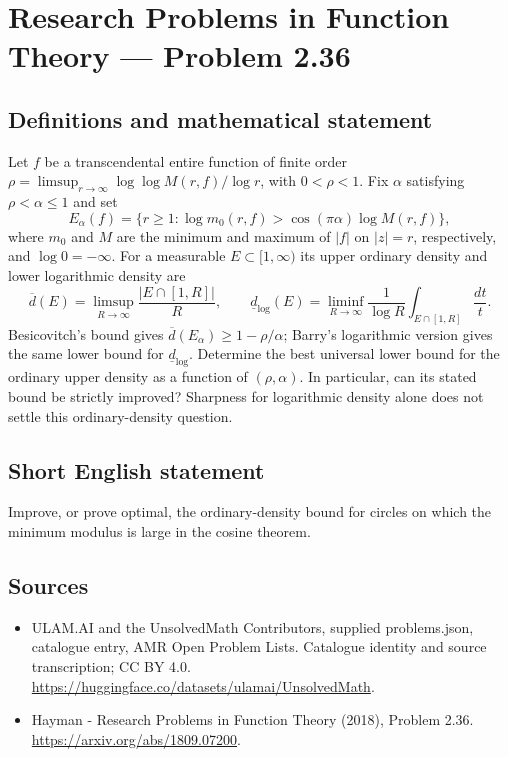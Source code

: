 \documentclass[11pt,a4paper]{article}
\begin{document}
\section*{Research Problems in Function Theory — Problem 2.36}\label{statement}

\subsection{Definitions and mathematical statement}
Let $f$ be a transcendental entire function of finite order
$\rho=\limsup_{r\to\infty}\log\log M(r,f)/\log r$, with $0<\rho<1$.
Fix $\alpha$ satisfying $\rho<\alpha\le1$ and set
\[
E_\alpha(f)=\{r\ge1:\log m_0(r,f)>\cos(\pi\alpha)\log M(r,f)\},
\]
where $m_0$ and $M$ are the minimum and maximum of $|f|$ on $|z|=r$, respectively, and $\log0=-\infty$.
For a measurable $E\subset[1,\infty)$ its upper ordinary density and lower logarithmic density are
\[
\overline d(E)=\limsup_{R\to\infty}\frac{|E\cap[1,R]|}{R},
\qquad
\underline d_{\log}(E)=\liminf_{R\to\infty}\frac1{\log R}\int_{E\cap[1,R]}\frac{dt}{t}.
\]
Besicovitch's bound gives $\overline d(E_\alpha)\ge1-\rho/\alpha$; Barry's logarithmic version gives the same lower bound for $\underline d_{\log}$. Determine the best universal lower bound for the ordinary upper density as a function of $(\rho,\alpha)$. In particular, can its stated bound be strictly improved? Sharpness for logarithmic density alone does not settle this ordinary-density question.
\subsection{Short English statement}
Improve, or prove optimal, the ordinary-density bound for circles on which the minimum modulus is large in the cosine theorem.
\subsection{Sources}
\begin{itemize}
\item[S1] ULAM.AI and the UnsolvedMath Contributors, supplied problems.json, catalogue entry, AMR Open Problem Lists. Catalogue identity and source transcription; CC BY 4.0.
\url{https://huggingface.co/datasets/ulamai/UnsolvedMath}.
\item[S2] Hayman - Research Problems in Function Theory (2018), Problem 2.36. 
\url{https://arxiv.org/abs/1809.07200}.
\end{itemize}
\end{document}
